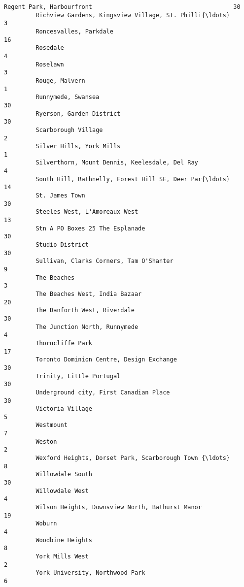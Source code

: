 \documentclass[11pt]{article}
\begin{document}
\begin{Verbatim}[commandchars=\\\{\}]
         Regent Park, Harbourfront                                        30   
         Richview Gardens, Kingsview Village, St. Philli{\ldots}                3   
         Roncesvalles, Parkdale                                           16   
         Rosedale                                                          4   
         Roselawn                                                          3   
         Rouge, Malvern                                                    1   
         Runnymede, Swansea                                               30   
         Ryerson, Garden District                                         30   
         Scarborough Village                                               2   
         Silver Hills, York Mills                                          1   
         Silverthorn, Mount Dennis, Keelesdale, Del Ray                    4   
         South Hill, Rathnelly, Forest Hill SE, Deer Par{\ldots}               14   
         St. James Town                                                   30   
         Steeles West, L'Amoreaux West                                    13   
         Stn A PO Boxes 25 The Esplanade                                  30   
         Studio District                                                  30   
         Sullivan, Clarks Corners, Tam O'Shanter                           9   
         The Beaches                                                       3   
         The Beaches West, India Bazaar                                   20   
         The Danforth West, Riverdale                                     30   
         The Junction North, Runnymede                                     4   
         Thorncliffe Park                                                 17   
         Toronto Dominion Centre, Design Exchange                         30   
         Trinity, Little Portugal                                         30   
         Underground city, First Canadian Place                           30   
         Victoria Village                                                  5   
         Westmount                                                         7   
         Weston                                                            2   
         Wexford Heights, Dorset Park, Scarborough Town {\ldots}                8   
         Willowdale South                                                 30   
         Willowdale West                                                   4   
         Wilson Heights, Downsview North, Bathurst Manor                  19   
         Woburn                                                            4   
         Woodbine Heights                                                  8   
         York Mills West                                                   2   
         York University, Northwood Park                                   6   
         

\end{Verbatim}
\end{document}
